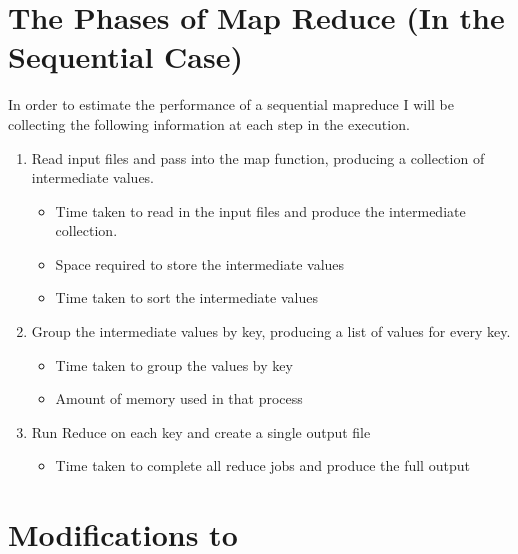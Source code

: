 \documentclass[letterpaper,10pt,english]{sphinxmanual}
\begin{document}
\section{The Phases of Map Reduce (In the Sequential Case)}
\label{\detokenize{labs/lab3report:the-phases-of-map-reduce-in-the-sequential-case}}
In order to estimate the performance of a sequential map\sphinxhyphen{}reduce
I will be collecting the following information at each step
in the execution.
\begin{enumerate}
%
\item {} 
Read input files and pass into the map function, producing
a collection of intermediate values.
\begin{itemize}
\item {} 
Time taken to read in the input files and produce
the intermediate collection.

\item {} 
Space required to store the intermediate values

\item {} 
Time taken to sort the intermediate values

\end{itemize}

\item {} 
Group the intermediate values by key, producing a list of
values for every key.
\begin{itemize}
\item {} 
Time taken to group the values by key

\item {} 
Amount of memory used in that process

\end{itemize}

\item {} 
Run Reduce on each key and create a single output file
\begin{itemize}
\item {} 
Time taken to complete all reduce jobs and produce
the full output

\end{itemize}

\end{enumerate}




\section{Modifications to }
\label{\detokenize{labs/lab3report:modifications-to-mrsequential-go}}


\renewcommand{\indexname}{Index}
\printindex
\end{document}

